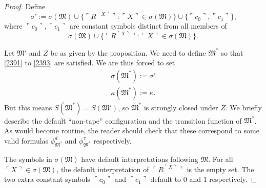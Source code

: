 \documentclass[12pt, twoside]{memoir}
\numberwithin{equation}{section}
\theoremstyle{definition}
\theoremstyle{remark}
\theoremstyle{definition}
\theoremstyle{definition}
\theoremstyle{definition}
\theoremstyle{remark}
\begin{document}
\begin{proof}
Define 
\begin{equation*}
    \sigma' := \sigma(\mathfrak{M}) \cup \{\ulcorner R^{\ulcorner X \urcorner} \urcorner : \ulcorner X \urcorner \in \sigma(\mathfrak{M})\} \cup \{\ulcorner c_0 \urcorner, \ulcorner c_1 \urcorner\} \text{,}
\end{equation*}
where $\ulcorner c_0 \urcorner, \ulcorner c_1 \urcorner$ are constant symbols distinct from all members of
\begin{equation*}
    \sigma(\mathfrak{M}) \cup \{\ulcorner R^{\ulcorner X \urcorner} \urcorner : \ulcorner X \urcorner \in \sigma(\mathfrak{M})\} \text{.}
\end{equation*}

Let $\mathfrak{M}'$ and $Z$ be as given by the proposition. We need to define $\mathfrak{M}^*$ so that \ref{2391} to \ref{2393} are satisfied. We are thus forced to set 
\begin{gather*}
    \sigma(\mathfrak{M}^*) := \sigma' \\
    \kappa(\mathfrak{M}^*) := \kappa \text{.}
\end{gather*}
But this means $S(\mathfrak{M}^*) = S(\mathfrak{M}')$, so $\mathfrak{M}^*$ is strongly closed under $Z$. We briefly describe the default ``non-tape'' configuration and the transition function of $\mathfrak{M}^*$. As would become routine, the reader should check that these correspond to some valid formulas $\phi^d_{\mathfrak{M^*}}$ and $\phi^{\tau}_{\mathfrak{M^*}}$ respectively.

The symbols in $\sigma(\mathfrak{M})$ have default interpretations following $\mathfrak{M}$. For all $\ulcorner X \urcorner \in \sigma(\mathfrak{M})$, the default interpretation of $\ulcorner R^{\ulcorner X \urcorner} \urcorner$ is the empty set. The two extra constant symbols $\ulcorner c_0 \urcorner$ and $\ulcorner c_1 \urcorner$ default to $0$ and $1$ respectively. 


\end{proof}
\end{document}

